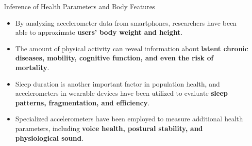 \documentclass[ucs,9pt,usenames,dvipsnames]{beamer}
\begin{document}
\begin{frame}{Inference of Health Parameters and Body Features}
\begin{itemize}
	\item By analyzing accelerometer data from smartphones, researchers have
	been able to approximate  \textbf{users’ body weight and height}.
	\item The amount of physical activity can reveal information about \textbf{latent chronic diseases, mobility, cognitive function, and even the risk of mortality}.
	\item Sleep duration is another important factor in population health, and accelerometers in	wearable devices have been utilized to evaluate \textbf{sleep patterns, fragmentation, and efficiency}. 
	\item Specialized accelerometers have been employed to measure additional health parameters, including \textbf{voice health, postural stability, and physiological sound}. 
\end{itemize}
\end{frame}
\end{document}
